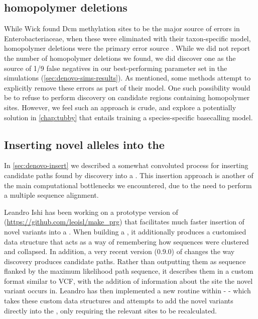 \subsection{\ont{} homopolymer deletions}
While Wick \etal{} found Dcm methylation sites to be the major source of errors in Enterobacteriaceae, when these were eliminated with their taxon-specific model, homopolymer deletions were the primary error source \cite{wick2019}. While we did not report the number of homopolymer deletions we found, we did discover one as the source of 1/9 false negatives in our best-performing parameter set in the simulations (\autoref{sec:denovo-sims-results}). As mentioned, some methods attempt to explicitly remove these errors as part of their model. One such possibility would be to refuse to perform \denovo{} discovery on candidate regions containing homopolymer sites. However, we feel such an approach is crude, and explore a potentially solution in \autoref{chap:tubby} that entails training a species-specific \ont{} basecalling model.  

\subsection{Inserting novel alleles into the \panrg{}}
\label{denovo-fw-insert}

In \autoref{sec:denovo-insert} we described a somewhat convoluted process for inserting candidate paths found by \denovo{} discovery into a \panrg{}. This insertion approach is another of the main computational bottlenecks we encountered, due to the need to perform a multiple sequence alignment. 

Leandro Ishi has been working on a prototype version of \makeprg{} (\url{https://github.com/leoisl/make_prg}) that facilitates much faster insertion of novel variants into a \panrg{}. When building a \prg{}, it additionally produces a customised data structure that acts as a way of remembering how sequences were clustered and collapsed. In addition, a very recent version (0.9.0) of \pandora{} changes the way \denovo{} discovery produces candidate paths. Rather than outputting them as sequence flanked by the maximum likelihood path sequence, it describes them in a custom format similar to VCF, with the addition of information about the \prg{} site the novel variant occurs in. Leandro has then implemented a new routine within \makeprg{} -  - which takes these custom data structures and attempts to add the novel variants directly into the \prg{}, only requiring the relevant sites to be recalculated. 

